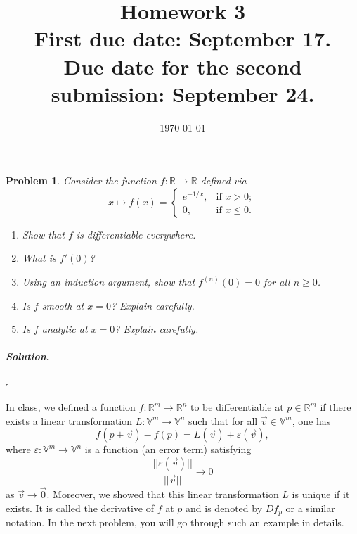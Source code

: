 \documentclass[reqno]{amsart}
\theoremstyle{plain}
\newtheorem{problem}{Problem}
\theoremstyle{definition}
\newenvironment{solution}{\paragraph{\emph{Solution}.}}{\hfill$\square$}
\begin{document}
 

\title[Homework 3]{Homework 3 \\ First due date: September 17.  \\  Due date for the second submission:  September 24.}

\date{\today} 
\maketitle 


\begin{problem}
Consider the function $f:\mathbb{R} \rightarrow \mathbb{R}$ defined via 
\begin{equation*}
x \mapsto f(x) = 
\begin{cases} 
e^{-1/x}, &\text{if } x>0;\\
0, &\text{if } x \le 0.
\end{cases} 
\end{equation*}
\begin{enumerate}
\item Show that $f$ is differentiable everywhere.
\item What is $f'(0)$?
\item Using an induction argument, show that $f^{(n)}(0) = 0$ for all $n \ge 0$.
\item Is $f$ smooth at $x=0$?  Explain carefully.
\item Is $f$ analytic at $x=0$?  Explain carefully.
\end{enumerate}
\end{problem}
\begin{solution}

\end{solution}

In class, we defined a function $f:\mathbb{R}^{m} \rightarrow \mathbb{R}^{n}$ to be differentiable at $p \in \mathbb{R}^{m}$ if there exists a linear transformation $L:\mathbb{V}^{m} \rightarrow \mathbb{V}^{n}$ such that for all $\vec{v} \in \mathbb{V}^{m}$, one has
$$f(p + \vec{v}) - f(p) = L(\vec{v}) + \varepsilon(\vec{v}), $$
where $\varepsilon:\mathbb{V}^{m} \rightarrow \mathbb{V}^{n}$ is a function (an error term) satisfying
$$\frac{||\varepsilon(\vec{v})||}{||\vec{v}||} \to 0 $$
as $\vec{v} \to \vec{0}$.  Moreover, we showed that this linear transformation $L$ is unique if it exists.  It is called the derivative of $f$ at $p$ and is denoted by $Df_{p}$ or a similar notation.  In the next problem, you will go through such an example in details.
\end{document}
